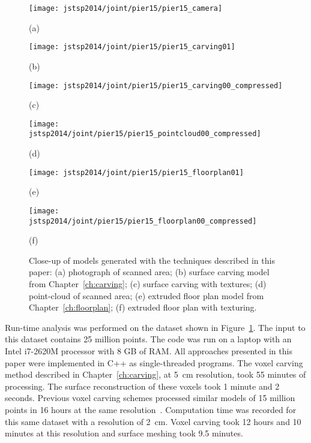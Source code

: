\documentclass[12pt,onecolumn,oneside]{book}
\begin{document}
\begin{figure}[t]

	\begin{minipage}[t]{0.30\linewidth}
		\centerline{\texttt{[image: jstsp2014/joint/pier15/pier15\_camera]}}
		\centerline{(a)}\medskip
	\end{minipage}
	\hfill
	\begin{minipage}[t]{0.30\linewidth}
		\centerline{\texttt{[image: jstsp2014/joint/pier15/pier15\_carving01]}}
		\centerline{(b)}\medskip
	\end{minipage}
	\hfill
	\begin{minipage}[t]{0.30\linewidth}
		\centerline{\texttt{[image: jstsp2014/joint/pier15/pier15\_carving00\_compressed]}}
		\centerline{(c)}\medskip
	\end{minipage}
	
	\begin{minipage}[b]{0.30\linewidth}
		\centerline{\texttt{[image: jstsp2014/joint/pier15/pier15\_pointcloud00\_compressed]}}
		\centerline{(d)}\medskip
	\end{minipage}
	\hfill
	\begin{minipage}[b]{0.30\linewidth}
		\centerline{\texttt{[image: jstsp2014/joint/pier15/pier15\_floorplan01]}}
		\centerline{(e)}\medskip
	\end{minipage}
	\hfill
	\begin{minipage}[b]{0.30\linewidth}
		\centerline{\texttt{[image: jstsp2014/joint/pier15/pier15\_floorplan00\_compressed]}}
		\centerline{(f)}\medskip
	\end{minipage}
	
	\caption[Comparison of models of construction environment.]{Close-up of models generated with the techniques described in this paper:  (a) photograph of scanned area; (b) surface carving model from Chapter~\ref{ch:carving}; (c) surface carving with textures; (d) point-cloud of scanned area; (e) extruded floor plan model from Chapter~\ref{ch:floorplan}; (f) extruded floor plan with texturing.}
	\label{fig:compare_pier15}

\end{figure}


Run-time analysis was performed on the dataset shown in Figure~\ref{fig:compare_pier15}.  The input to this dataset contains 25 million points.  The code was run on a laptop with an Intel i7-2620M processor with 8 GB of RAM.  All approaches presented in this paper were implemented in C++ as single-threaded programs.  The voxel carving method described in Chapter~\ref{ch:carving}, at 5~cm resolution, took 55 minutes of processing.  The surface reconstruction of these voxels took 1 minute and 2 seconds.  Previous voxel carving schemes processed similar models of 15 million points in 16 hours at the same resolution~\cite{Carving}.  Computation time was recorded for this same dataset with a resolution of 2~cm.  Voxel carving took 12 hours and 10 minutes at this resolution and surface meshing took 9.5 minutes.
\end{document}
